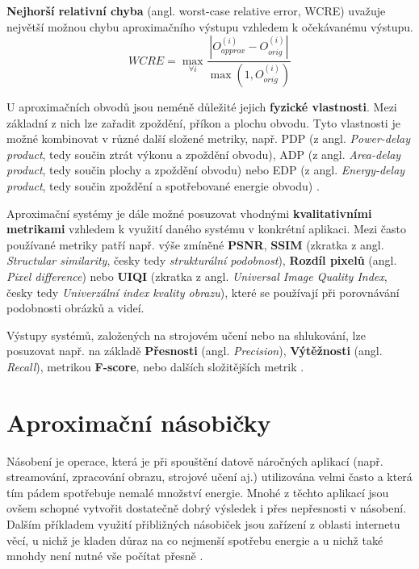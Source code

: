 \textbf{Nejhorší relativní chyba} (angl. worst-case relative error, WCRE) uvažuje největší možnou chybu aproximačního výstupu vzhledem k očekávanému výstupu.
\begin{equation}
    WCRE = \max_{\forall i} \frac{\left|{O_{approx}^{(i)} - O_{orig}^{(i)}}\right|} {\max(1,O_{orig}^{(i)})} 
\end{equation}

\bigskip

U aproximačních obvodů jsou neméně důležité jejich \textbf{fyzické vlastnosti}. Mezi základní z nich lze zařadit zpoždění, příkon a plochu obvodu. Tyto vlastnosti je možné kombinovat v různé další složené metriky, např. PDP (z angl. \textit{Power-delay product}, tedy součin ztrát výkonu a zpoždění obvodu), ADP (z angl. \textit{Area-delay product}, tedy součin plochy a zpoždění obvodu) nebo EDP (z angl. \textit{Energy-delay product}, tedy součin zpoždění a spotřebované energie obvodu) \cite{approx_arith_circuits}.

\bigskip

Aproximační systémy je dále možné posuzovat vhodnými \textbf{kvalitativními metrikami} vzhledem k využití daného systému v konkrétní aplikaci. Mezi často používané metriky \cite{ac_techniques} patří např. výše zmíněné \textbf{PSNR}, \textbf{SSIM} (zkratka z angl. \textit{Structular similarity}, česky tedy \textit{strukturální podobnost}), \textbf{Rozdíl pixelů} (angl. \textit{Pixel difference}) nebo \textbf{UIQI} (zkratka z angl. \textit{Universal Image Quality Index}, česky tedy \textit{Univerzální index kvality obrazu}), které se používají při porovnávání podobnosti obrázků a videí.

Výstupy systémů, založených na strojovém učení nebo na shlukování, lze posuzovat např. na základě \textbf{Přesnosti} (angl. \textit{Precision}), \textbf{Výtěžnosti} (angl. \textit{Recall}), metrikou \textbf{F-score}, nebo dalších složitějších metrik \cite{clustering_eval}.

\section{Aproximační násobičky} \label{approx_mult}
Násobení je operace, která je při spouštění datově náročných aplikací (např. streamování, zpracování obrazu, strojové učení aj.) utilizována velmi často a která tím pádem spotřebuje nemalé množství energie. Mnohé z těchto aplikací jsou ovšem schopné vytvořit dostatečně dobrý výsledek i přes nepřesnosti v násobení. Dalším příkladem využití přibližných násobiček jsou zařízení z oblasti internetu věcí, u nichž je kladen důraz na co nejmenší spotřebu energie a u nichž také mnohdy není nutné vše počítat přesně \cite{approx_mult_survey}.

